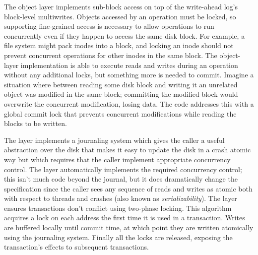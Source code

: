 The object layer implements sub-block access on top of the write-ahead
log's block-level multiwrites. Objects accessed by an operation must be locked,
so supporting fine-grained access is necessary to allow operations to run
concurrently even if they happen to access the same disk block. For example, a
file system might pack inodes into a block, and locking an inode should not
prevent concurrent operations for other inodes in the same block. The
object-layer implementation is able to execute reads and writes during an
operation without any additional locks, but something more is needed to commit.
Imagine a situation where between reading some disk block and writing it an
unrelated object was modified in the same block; committing the modified block
would overwrite the concurrent modification, losing data. The code addresses
this with a global commit lock that prevents concurrent modifications while
reading the blocks to be written.

The  layer implements a journaling system which gives the caller a
useful abstraction over the disk that makes it easy to update the disk in a
crash atomic way but which requires that the caller implement appropriate
concurrency control. The  layer automatically implements the required
concurrency control; this isn't much code beyond the journal, but it does
dramatically change the specification since the caller sees any sequence of
reads and writes as atomic both with respect to threads and crashes (also known
as \emph{serializability}). The  layer ensures transactions don't
conflict using two-phase locking. This algorithm acquires a lock on each address
the first time it is used in a transaction. Writes are buffered locally until
commit time, at which point they are written atomically using the journaling
system. Finally all the locks are released, exposing the transaction's effects
to subsequent transactions.
